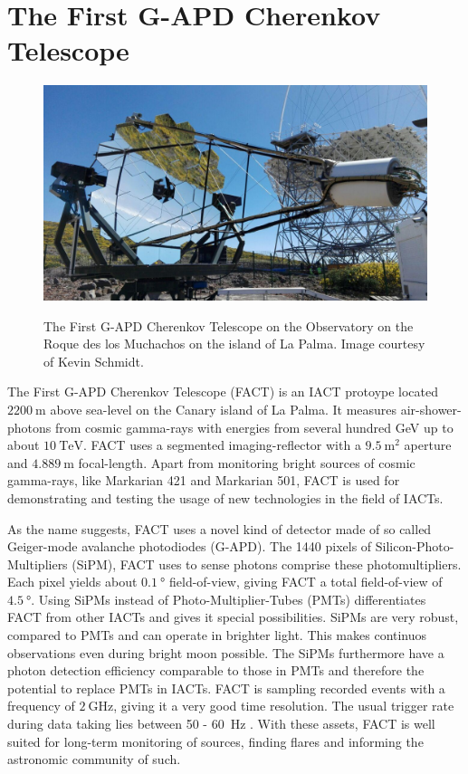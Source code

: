 \chapter{The First G-APD Cherenkov Telescope}\label{ch:fact}
%
\begin{figure}
  \centering
  \includegraphics[width=\textwidth]{Plots/fact.jpg}
  \label{fig:fact}
  \caption{The First G-APD Cherenkov Telescope on the Observatory on the Roque des los Muchachos on the island of La Palma. Image courtesy of Kevin Schmidt.}
\end{figure}
%
The First G-APD Cherenkov Telescope \cite{FACT-Design} (FACT) is an IACT
protoype located $\SI{2200}{\metre}$ above sea-level on the Canary island of La
Palma. It measures air-shower-photons from cosmic gamma-rays with energies from
several hundred GeV up to about $\SI{10}{\tera\electronvolt}$. FACT uses a
segmented imaging-reflector with a $\SI{9.5}{\meter\squared}$ aperture and
$\SI{4.889}{\meter}$ focal-length. Apart from monitoring bright sources of
cosmic gamma-rays, like Markarian 421 and Markarian 501, FACT is used for
demonstrating and testing the usage of new technologies in the field of IACTs.

As the name suggests, FACT uses a novel kind of detector made of so called
Geiger-mode avalanche photodiodes (G-APD). The 1440 pixels of Silicon-Photo-Multipliers (SiPM), FACT uses to sense photons comprise these photomultipliers.
Each pixel yields about $\SI{0.1}{\degree}$ field-of-view, giving FACT
a total field-of-view of $\SI{4.5}{\degree}$. Using SiPMs instead of
Photo-Multiplier-Tubes (PMTs) differentiates FACT from other IACTs and gives it
special possibilities. SiPMs are very robust, compared to PMTs and can operate
in brighter light. This makes continuos observations even during bright moon
possible. The SiPMs furthermore have a photon detection efficiency comparable to those in PMTs and therefore the potential to replace PMTs in IACTs. FACT is sampling recorded
events with a frequency of $\SI{2}{\giga\hertz}$, giving it a very good time
resolution. The usual trigger rate during data taking lies between \num{50} - \SI{60}{\hertz} \cite{FACT-Design}. With these assets, FACT is well suited for long-term monitoring of
sources, finding flares and informing the astronomic community of such.
